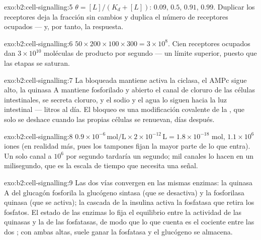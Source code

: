 \begin{solution}{exo:b2:cell-signalling:5}
$\theta = [L]/(K_d + [L])$: $0.09$, $0.5$, $0.91$, $0.99$. Duplicar los
receptores deja la fracción sin cambios y duplica el número de receptores
ocupados --- y, por tanto, la respuesta.
\end{solution}

\begin{solution}{exo:b2:cell-signalling:6}
$50\times 200\times 100\times 300 = 3\times 10^{8}$. Cien receptores
ocupados dan $3\times 10^{10}$ moléculas de producto por segundo --- un
límite superior, puesto que las etapas se saturan.
\end{solution}

\begin{solution}{exo:b2:cell-signalling:7}
La  bloqueada mantiene activa la ciclasa, el AMPc sigue alto, la
quinasa A mantiene fosforilado y abierto el canal de cloruro de las
células intestinales, se secreta cloruro, y el sodio y el agua lo siguen
hacia la luz intestinal --- litros al día. El bloqueo es una modificación
covalente de la , que solo se deshace cuando las propias células
se renuevan, días después.
\end{solution}

\begin{solution}{exo:b2:cell-signalling:8}
$0.9\times 10^{-6}\,\text{mol/L}\times 2\times 10^{-12}\,\text{L} =
1.8\times 10^{-18}$ mol, $1.1\times 10^{6}$ iones (en realidad más, pues
los tampones fijan la mayor parte de lo que entra). Un solo canal a
$10^{6}$ por segundo tardaría un segundo; mil canales lo hacen en un
milisegundo, que es la escala de tiempo que necesita una señal.
\end{solution}

\begin{solution}{exo:b2:cell-signalling:9}
Las dos vías convergen en las mismas enzimas: la quinasa A del glucagón
fosforila la glucógeno sintasa (que se desactiva) y la fosforilasa quinasa
(que se activa); la cascada de la insulina activa la fosfatasa que retira
los fosfatos. El estado de las enzimas lo fija el equilibrio entre la
actividad de las quinasas y la de las fosfatasas, de modo que lo que
cuenta es el cociente entre las dos ; con ambas altas, suele ganar
la fosfatasa y el glucógeno se almacena.
\end{solution}

